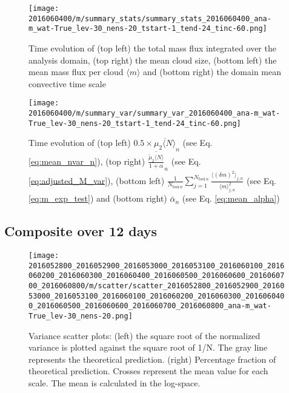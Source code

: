 \documentclass[a4paper, 12pt]{article}
\begin{document}
\begin{figure}[ht] \label{fig:ex_summary_stats}
\noindent \centering
\texttt{[image: 2016060400/m/summary\_stats/summary\_stats\_2016060400\_ana-m\_wat-True\_lev-30\_nens-20\_tstart-1\_tend-24\_tinc-60.png]}\\
\caption{Time evolution of (top left) the total mass flux integrated over the analysis domain, (top right) the mean cloud size, (bottom left) the mean mass flux per cloud $\langle m \rangle$ and (bottom right) the domain mean convective time scale}
\end{figure}

\begin{figure}[ht] \label{fig:ex_summary_var}
\noindent \centering
\texttt{[image: 2016060400/m/summary\_var/summary\_var\_2016060400\_ana-m\_wat-True\_lev-30\_nens-20\_tstart-1\_tend-24\_tinc-60.png]}\\
\caption{Time evolution of (top left) $0.5 \times \overline{\mu_{2}\langle N \rangle}_n$ (see Eq. \ref{eq:mean_nvar_n}), (top right) $\overline{\frac{\tilde{\mu}_2 \langle N \rangle}{1+\alpha}}_n$ (see Eq. \ref{eq:adjusted_M_var}), (bottom left) $\frac{1}{N_{\mathrm{box}\,n}} \sum_{j=1}^{N_{\mathrm{box}\,n}} \frac{\langle (\delta m)^2 \rangle_{j,n}}{\langle m \rangle_{j,n}^2}$ (see Eq. \ref{eq:m_exp_test}) and (bottom right) $\bar{\alpha}_n$ (see Eq. \ref{eq:mean_alpha})}
\end{figure}
\newpage
\clearpage

\subsection{Composite over 12 days}

\begin{figure}[ht] \label{fig:comp_scatter}
\noindent \centering
\texttt{[image: 2016052800\_2016052900\_2016053000\_2016053100\_2016060100\_2016060200\_2016060300\_2016060400\_2016060500\_2016060600\_2016060700\_2016060800/m/scatter/scatter\_2016052800\_2016052900\_2016053000\_2016053100\_2016060100\_2016060200\_2016060300\_2016060400\_2016060500\_2016060600\_2016060700\_2016060800\_ana-m\_wat-True\_lev-30\_nens-20.png]}\\
\caption{Variance scatter plots: (left) the square root of the normalized variance is plotted against the square root of 1/N. The gray line represents the theoretical prediction. (right) Percentage fraction of theoretical prediction. Crosses represent the mean value for each scale. The mean is calculated in the log-space.}
\end{figure}
\end{document}
